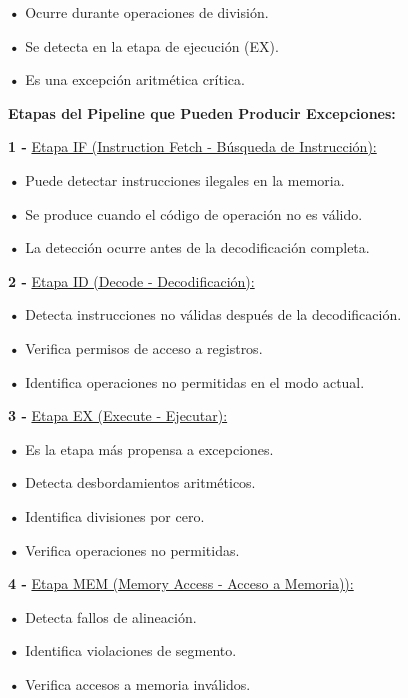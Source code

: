 \documentclass{article}
\begin{document}
\textbf{    •} { Ocurre durante operaciones de división.}

\textbf{    •} { Se detecta en la etapa de ejecución (EX).}

\textbf{    •} { Es una excepción aritmética crítica.}

\quad

\textbf{ Etapas del Pipeline que Pueden Producir Excepciones: }

\quad

\textbf{1 -  } {\underline{Etapa IF (Instruction Fetch - Búsqueda de Instrucción): }}

\quad

\textbf{    •} { Puede detectar instrucciones ilegales en la memoria.}

\textbf{    •} { Se produce cuando el código de operación no es válido.}

\textbf{    •} { La detección ocurre antes de la decodificación completa.}

\quad

\textbf{2 -  } {\underline{Etapa ID (Decode - Decodificación): }}

\quad

\textbf{    •} { Detecta instrucciones no válidas después de la decodificación.}

\textbf{    •} { Verifica permisos de acceso a registros.}

\textbf{    •} { Identifica operaciones no permitidas en el modo actual.}

\quad

\textbf{3 -  } {\underline{Etapa EX (Execute - Ejecutar): }}

\quad

\textbf{    •} { Es la etapa más propensa a excepciones.}

\textbf{    •} { Detecta desbordamientos aritméticos.}

\textbf{    •} { Identifica divisiones por cero.}

\textbf{    •} { Verifica operaciones no permitidas.}

\quad

\textbf{4 -  } {\underline{Etapa MEM (Memory Access - Acceso a Memoria)): }}

\quad

\textbf{    •} { Detecta fallos de alineación.}

\textbf{    •} { Identifica violaciones de segmento.}

\textbf{    •} { Verifica accesos a memoria inválidos.}
\end{document}

